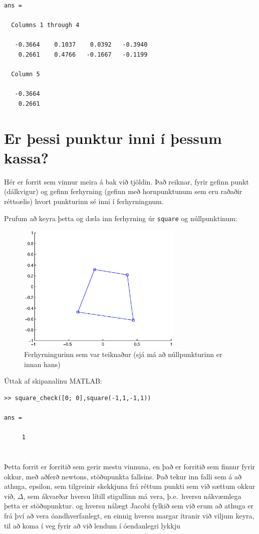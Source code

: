 \documentclass[a4]{article}
\begin{document}
\begin{flushright}
\begin{lstlisting}
ans =

  Columns 1 through 4

   -0.3664    0.1037    0.0392   -0.3940
    0.2661    0.4766   -0.1667   -0.1199

  Column 5

   -0.3664
    0.2661
\end{lstlisting}


\section{Er þessi punktur inni í þessum kassa?}

Hér er forrit sem vinnur meira á bak við tjöldin. Það reiknar, fyrir gefinn punkt (dálkvigur) og gefinn ferhyrning (gefinn með hornpunktunum sem eru raðaðir réttsælis) hvort punkturinn sé inni í ferhyrningnum.



Prufum að keyra þetta og dæla inn ferhyrning úr \lstinline{square} og núllpunktinum:

\begin{figure}[h!]
\centering
\includegraphics[width=0.7\textwidth]{sqchdaemi.eps}
\caption{Ferhyrningurinn sem var teiknaður (sjá má að núllpunkturinn er innan hans)}
\end{figure}

Úttak af skipanalínu MATLAB:

\begin{lstlisting}
>> square_check([0; 0],square(-1,1,-1,1))

ans =

     1
\end{lstlisting}

\section{}
Þetta forrit er forritið sem gerir mestu vinnuna, en það er forritið sem finnur fyrir okkur, með aðferð newtons, stöðupunkta fallsins. Það tekur inn falli sem á að athuga,
epsilon, sem tilgreinir skekkjuna frá réttum punkti sem við sættum okkur við,
$\Delta$, sem ákvarðar hversu lítill stigullinn má vera, þ.e.\ hversu nákvæmlega þetta er stöðupunktur.
og hversu nálægt Jacobi fylkið sem við erum að athuga er frá því að vera óandhverfanlegt,
en einnig hversu margar ítranir við viljum keyra, til að koma í veg fyrir að við lendum í óendanlegri lykkju


\end{flushright}
\end{document}
